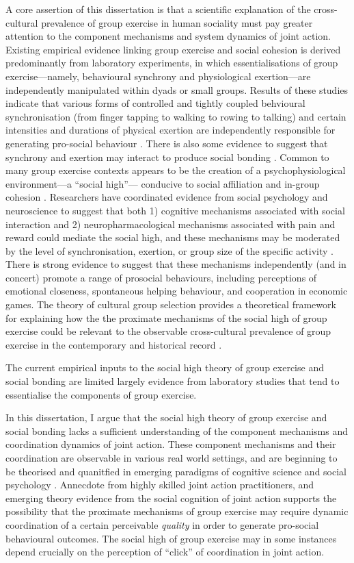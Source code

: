 A core assertion of this dissertation is that a scientific explanation of the cross-cultural prevalence of group exercise in human sociality must pay greater attention to the component mechanisms and system dynamics of joint action.  Existing empirical evidence linking group exercise and social cohesion is derived predominantly from laboratory experiments, in which essentialisations of group exercise---namely, behavioural synchrony and physiological exertion---are independently manipulated within dyads or small groups.  Results of these studies indicate that various forms of controlled and tightly coupled  behvioural synchronisation (from finger tapping to walking to rowing to talking) and certain intensities and durations of physical exertion are independently responsible for generating pro-social behaviour \citep{Tarr2015}.  There is also some evidence to suggest that synchrony and exertion may interact to produce social bonding \citep{Lewis2018}.  Common to many group exercise contexts appears to be the creation of a psychophysiological environment---a ``social high''--- conducive to social affiliation and in-group cohesion \citep{Davis2015}. Researchers have coordinated evidence from social psychology and neuroscience to suggest that both 1) cognitive mechanisms associated with social interaction and 2) neuropharmacological mechanisms associated with pain and reward could mediate the social high, and these mechanisms may be moderated by the level of synchronisation, exertion, or group size of the specific activity \citep{Mogan2017}. There is strong evidence to suggest that these mechanisms independently (and in concert) promote a range of prosocial behaviours, including perceptions of emotional closeness, spontaneous helping behaviour, and cooperation in economic games. The theory of cultural group selection provides a theoretical framework for explaining how the the proximate mechanisms of the social high of group exercise could be relevant to the observable cross-cultural prevalence of group exercise in the contemporary and historical record \citep{Dunbar2010,Whitehouse2014a}.

The current empirical inputs to the social high theory of group exercise and social bonding are limited largely evidence from laboratory studies that tend to essentialise the components of group exercise.

In this dissertation, I argue that the social high theory of group exercise and social bonding lacks a sufficient understanding of the component mechanisms and coordination dynamics of joint action.  These component mechanisms and their coordination are observable in various real world settings, and are beginning to be theorised and quanitfied in emerging paradigms of cognitive science and social psychology \citep{Marsh2009}.  Annecdote from highly skilled joint action practitioners, and emerging theory evidence from the social cognition of joint action supports the possibility that the proximate mechanisms of group exercise may require dynamic coordination of a certain perceivable \textit{quality} in order to generate pro-social behavioural outcomes.  The social high of group exercise may in some instances depend crucially on the perception of ``click'' of coordination in joint action.

